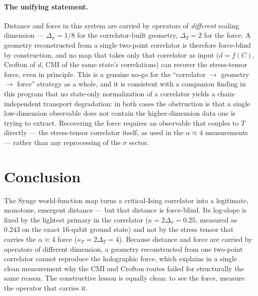 \documentclass[11pt]{article}
\begin{document}
\paragraph{The unifying statement.}
Distance and force in this system are carried by operators of \emph{different} scaling
dimension --- $\Delta_\sigma=1/8$ for the correlator-built geometry, $\Delta_T=2$ for the
force. A geometry reconstructed from a single two-point correlator is therefore force-blind
by construction, and no map that takes only that correlator as input
($d=f(C)$, Crofton of $d$, CMI of the same state's correlations) can recover the
stress-tensor force, even in principle. This is a genuine no-go for the
``correlator $\to$ geometry $\to$ force'' strategy as a whole, and it is consistent with a
companion finding in this program that no state-only normalization of a correlator yields a
chain-independent transport degradation: in both cases the obstruction is that a single
low-dimension observable does not contain the higher-dimension data one is trying to extract.
Recovering the force requires an observable that couples to $T$ directly --- the
stress-tensor correlator itself, as used in the $\alpha\approx4$ measurements --- rather than
any reprocessing of the $\sigma$ sector.

\section{Conclusion}
\label{sec:conclusion}

The Synge world-function map turns a critical-Ising correlator into a legitimate, monotone,
emergent distance --- but that distance is force-blind. Its log-slope is fixed by the
lightest primary in the correlator ($\kappa=2\Delta_\sigma=0.25$, measured as $0.243$ on the
exact 16-qubit ground state) and not by the stress tensor that carries the $\alpha\approx4$
force ($\kappa_T=2\Delta_T=4$). Because distance and force are carried by operators of
different dimension, a geometry reconstructed from one two-point correlator cannot reproduce
the holographic force, which explains in a single clean measurement why the CMI and Crofton
routes failed for structurally the same reason. The constructive lesson is equally clean: to
see the force, measure the operator that carries it.
\end{document}
